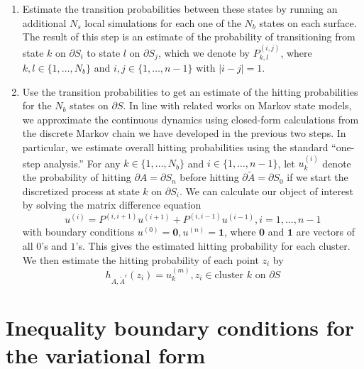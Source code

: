 \documentclass[english, aip, jcp, priprint, graphicx,floatfix]{revtex4-1}
\theoremstyle{plain}
\theoremstyle{definition}
\theoremstyle{plain}
\begin{document}
{{\begin{enumerate}
\begin{enumerate}
  \item For each one of the surfaces $\partial S_1, \ldots, \partial S_{n -
  1}$, cluster the $N_p$ samples on that surface into $N_b \,$ states. 
\end{enumerate}

The result of this step is a partitioning of each shell $\partial S_i$ into
$N_b$ discrete regions. 

\item Estimate the transition probabilities between these states by running an additional $N_s$ local simulations for each one of the $N_b$ states on each surface. The result of this step is an estimate of the probability of transitioning from state $k$ on $\partial S_i$ to state $l$ on $\partial S_j$, which we denote by $P^{(i, j)}_{k, l}$, where $k, l \in \{ 1, \ldots, N_b \}$ and $i, j \in \{ 1, \ldots, n - 1 \}$ with $| i - j | = 1$.
  
\item Use the transition probabilities to get an estimate of the hitting probabilities for the $N_b$ states on
  $\partial S$.  In line with related works on Markov state models,\cite{Pande2010-yi, Chodera2014-bh, Husic2018-xp} we  approximate the continuous dynamics using closed-form calculations from the discrete Markov chain we have developed in the previous two steps.  In particular, we estimate overall hitting probabilities using the standard ``one-step analysis.'' For any $k \in \{ 1, \ldots, N_b \}$ and $i \in \{ 1, \ldots, n - 1 \}$, let $u^{(i)}_k$ denote the probability of hitting $\partial A = \partial S_n$ before hitting $\partial \tilde{A} = \partial S_0$ if we start the discretized process at state $k$ on $\partial S_i$.  We can calculate our object of interest by solving the matrix difference equation \[ u^{(i)} = P^{(i, i + 1)} u^{(i + 1)} + P^{(i, i - 1)} u^{(i - 1)}, i = 1, \ldots, n - 1 \] with boundary conditions $u^{(0)} = {\textbf{0}}, u^{(n)} = {\textbf{1} }$, where ${\textbf{0}}$ and ${\textbf{1}}$ are vectors of all $0$'s and $1$'s. This gives the estimated hitting probability for each cluster.  We then estimate the hitting probability of each point $z_i$ by
  \begin{equation}
      \label{equ:hitprobest}
  h_{A,\tilde A^c}(z_i) = u^{(m)}_k, z_i \in \text{cluster }k\text{ on }\partial S\end{equation}
\end{enumerate}
}}


\section{Inequality boundary conditions for the variational form}
\end{document}

